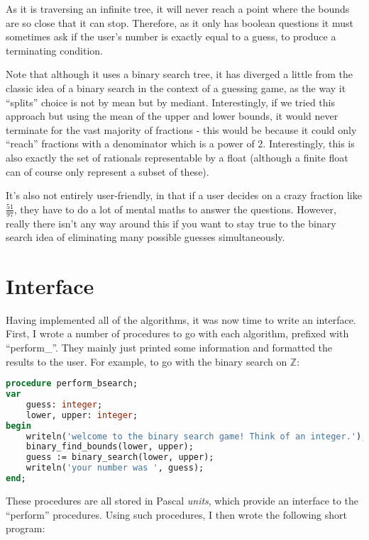 \documentclass[fleqn,a4paper,11pt]{article}
\begin{document}
    As it is traversing an infinite tree, it will never reach a point where the
    bounds are so close that it can stop. Therefore, as it only has boolean
    questions it must sometimes ask if the user's number is exactly equal to a
    guess, to produce a terminating condition.

    Note that although it uses a binary search tree, it has diverged a little
    from the classic idea of a binary search in the context of a guessing game,
    as the way it ``splits'' choice is not by mean but by mediant.
    Interestingly, if we tried this approach but using the mean of the upper and
    lower bounds, it would never terminate for the vast majority of fractions -
    this would be because it could only ``reach'' fractions with a denominator
    which is a power of 2. Interestingly, this is also exactly the set of
    rationals representable by a float (although a finite float can of course
    only represent a subset of these).

    It's also not entirely user-friendly, in that if a user decides on a crazy
    fraction like \(\frac{51}{97}\), they have to do a lot of mental maths to
    answer the questions. However, really there isn't any way around this if you
    want to stay true to the binary search idea of eliminating many possible
    guesses simultaneously.

    \section{Interface}

    Having implemented all of the algorithms, it was now time to write an
    interface. First, I wrote a number of procedures to go with each algorithm,
    prefixed with ``perform\_''. They mainly just printed some information and
    formatted the results to the user. For example, to go with the binary search
    on \(\mathbb{Z}\):

\begin{lstlisting}[language=Pascal, caption=Binary search on \(\mathbb{Z}\) wrapper procedure]
procedure perform_bsearch;
var
    guess: integer;
    lower, upper: integer;
begin
    writeln('welcome to the binary search game! Think of an integer.');
    binary_find_bounds(lower, upper);
    guess := binary_search(lower, upper);
    writeln('your number was ', guess);
end;
\end{lstlisting}

    These procedures are all stored in Pascal \emph{units}, which provide an
    interface to the ``perform'' procedures. Using such procedures, I then wrote
    the following short program:
\end{document}
